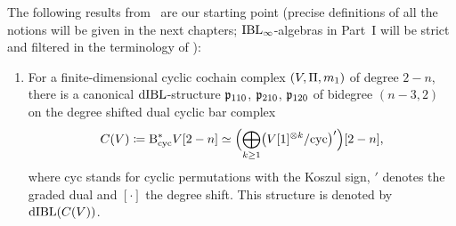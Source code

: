\documentclass[\MainFolder/Text.tex]{subfiles}
\begin{document}
The following results from~\cite[Corollary~11.9]{Cieliebak2015} are our starting point (precise definitions of all the notions will be given in the next chapters; $\mathrm{IBL}_\infty$-algebras in Part~I will be strict and filtered in the terminology of \cite{Cieliebak2015}): 
%
\begin{enumerate}[listparindent=\parindent,label=\textbf{(\Alph*)}]
\item For a finite-dimensional cyclic cochain complex $(V,\Pi,m_1)$ of degree $2-n$, 
there is a canonical $\mathrm{dIBL}$-structure $\mathfrak{p}_{110}$, $\mathfrak{p}_{210}$, $\mathfrak{p}_{120}$ of bidegree $(n-3,2)$ on the degree shifted dual cyclic bar complex
$$ C(V)\coloneqq \mathrm{B}_{\mathrm{cyc}}^* V[2-n] \simeq \Bigl(\bigoplus_{k\ge 1} \bigl(V[1]^{\otimes k} / \text{cyc}\bigr)' \Bigr)[2-n], $$
where $\mathrm{cyc}$ stands for cyclic permutations with the Koszul sign, $'$ denotes the graded dual and $[\cdot]$ the degree shift. This structure is denoted by $\mathrm{dIBL}(C(V))$.


\end{enumerate}
\end{document}
